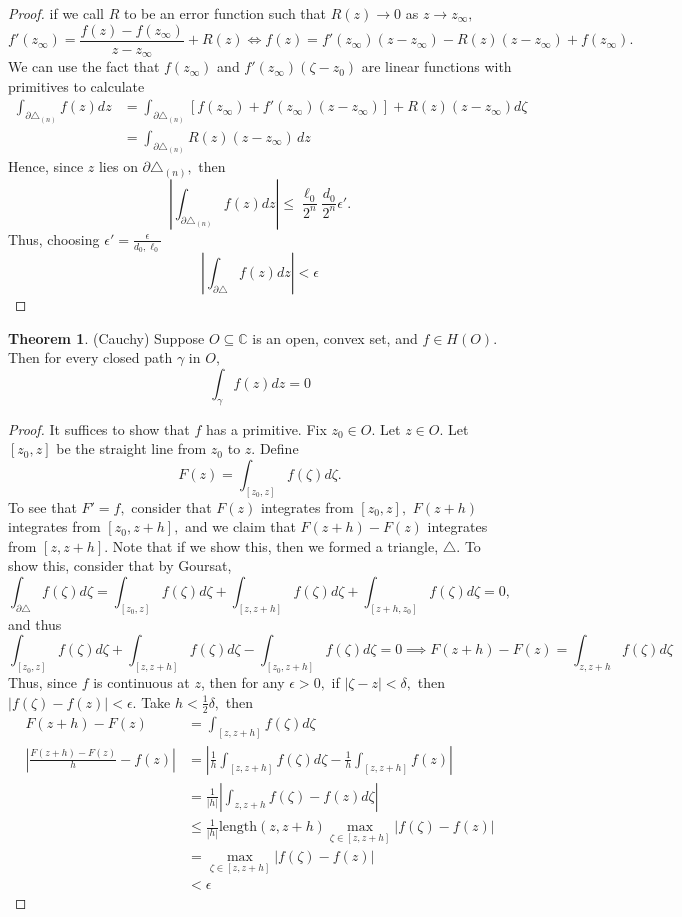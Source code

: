 \documentclass[10pt, oneside]{article}
\newcommand{\bbC}{\mathbb{C}}
\theoremstyle{definition}
\newtheorem{thm}{Theorem}
\begin{document}
\begin{proof}
    if we call $R$ to be an error function such that $R(z)\to 0$ as $z\to z_{\infty},$ 
    \[f'(z_\infty) = \frac{f(z) - f(z_\infty)}{z- z_\infty} + R(z) \iff f(z)= f'(z_{\infty})(z - z_{\infty}) - R(z)(z - z_{\infty}) + f(z_{\infty}).\]
    We can use the fact that $f(z_\infty)$ and  $f'(z_\infty)(\zeta - z_0)$ are linear functions with primitives to calculate
    \begin{align*}
    \int_{\partial \triangle_{(n)}}f(z)dz &= \int_{\partial \triangle_{(n)}} [f(z_\infty) + f'(z_\infty)(z - z_\infty)] + R(z)(z- z_{\infty}) d\zeta \\
    &= \int_{\partial \triangle_{(n)}}R(z)(z - z_\infty)\,dz
    \end{align*}
    Hence, since $z$ lies on $\partial \triangle_{(n)},$ then 
    \[\left|\int_{\partial \triangle_{(n)}}f(z)dz\right| \leq \frac{\ell_0   }{2^n} \frac{d_0}{2^n}\epsilon'.\] Thus, choosing $\epsilon'= \frac{\epsilon}{d_0, \ell_0}$
    \[\left|\int_{\partial \triangle}f(z)dz\right| <\epsilon\]
\end{proof}

\begin{thm}
    (Cauchy) Suppose $O\subseteq \bbC$ is an open, convex set, and $f\in H(O).$ Then for every closed path $\gamma$ in $O,$ 
    \[\int_\gamma f(z)dz = 0\]
\end{thm}

\begin{proof}
    It suffices to show that $f$ has a primitive. Fix $z_0 \in O.$ Let $z\in O.$ Let $[z_0, z]$ be the straight line from $z_0$ to $z.$ Define
    \[F(z) = \int_{[z_0, z]}f(\zeta)d\zeta.\] To see that $F' = f,$ consider that $F(z)$ integrates from $[z_0, z],$ $F(z + h)$ integrates from $[z_0, z + h],$ and we claim that $F(z + h) - F(z)$ integrates from $[z,z + h].$ Note that if we show this, then we formed a triangle, $\triangle$. To show this, 
    consider that by Goursat,
    \[\int_{\partial \triangle} f(\zeta)d\zeta = \int_{[z_0, z]} f(\zeta)d\zeta + \int_{[z, z + h]} f(\zeta)d\zeta + \int_{[z + h, z_0]} f(\zeta)d\zeta = 0,\] and thus 
    \[\int_{[z_0, z]} f(\zeta)d\zeta + \int_{[z, z + h]} f(\zeta)d\zeta - \int_{[z_0, z + h]} f(\zeta)d\zeta = 0 \implies F(z + h)- F(z)= \int_{z, z + h}f(\zeta)d\zeta\]
    Thus, since $f$ is continuous at $z$, then for any $\epsilon>0,$ if $|\zeta - z|< \delta,$ then $|f(\zeta) - f(z)|< \epsilon.$ Take $h< \frac{1}{2}\delta,$ then 
    \begin{align*}
    F(z + h) - F(z) &= \int_{[z, z + h]}f(\zeta)d\zeta\\
        \left|\frac{F(z + h) - F(z)}{h} - f(z)\right| &= \left|\frac{1}{h}\int_{[z, z + h]}f(\zeta)d\zeta - \frac{1}{h}\int_{[z,z + h]}f(z)\right|\\
        &= \frac{1}{|h|}\left|\int_{z, z + h} f(\zeta) - f(z)d\zeta\right|\\
        &\leq \frac{1}{|h|}\text{length}(z, z + h) \max_{\zeta\in [z, z + h]}|f(\zeta) - f(z)|\\
        &= \max_{\zeta \in [z, z + h]}|f(\zeta) - f(z)|\\
        &< \epsilon
    \end{align*}
\end{proof}
\end{document}
